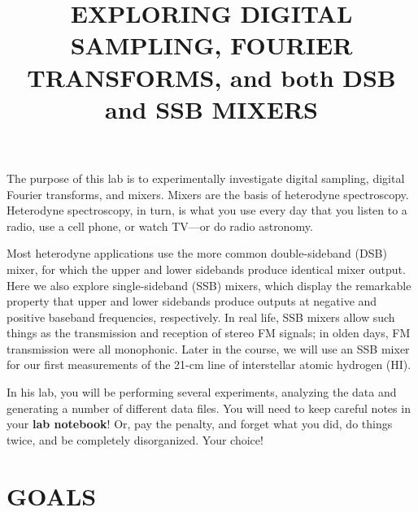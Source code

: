 \documentclass[11pt,preprint]{aastex}
\begin{document}
\def\simlt{\lower.5ex\hbox{$\; \buildrel < \over \sim \;$}}
\def\simgt{\lower.5ex\hbox{$\; \buildrel > \over \sim \;$}}

\title {EXPLORING DIGITAL SAMPLING, FOURIER TRANSFORMS, and both DSB and
  SSB MIXERS}

\tableofcontents

	The purpose of this lab is to experimentally investigate digital
sampling, digital Fourier transforms, and mixers. Mixers are the basis
of heterodyne spectroscopy. Heterodyne spectroscopy, in turn, is what
you use every day that you listen to a radio, use a cell phone, or watch
TV---or do radio astronomy.  

Most heterodyne applications use the more common double-sideband (DSB)
mixer, for which the upper and lower sidebands produce identical mixer
output. Here we also explore single-sideband (SSB) mixers, which display
the remarkable property that upper and lower sidebands produce outputs
at negative and positive baseband frequencies, respectively. In real
life, SSB mixers allow such things as the transmission and reception of
stereo FM signals; in olden days, FM transmission were all monophonic.
Later in the course, we will use an SSB mixer for our first measurements
of the 21-cm line of interstellar atomic hydrogen (HI). 

In his lab, you will be performing several experiments, analyzing the
data and generating a number of different data files. You will need to
keep careful notes in your {\bf lab notebook}! Or, pay the penalty, and
forget what you did, do things twice, and be completely
disorganized. Your choice!

\section{GOALS}
\end{document}
